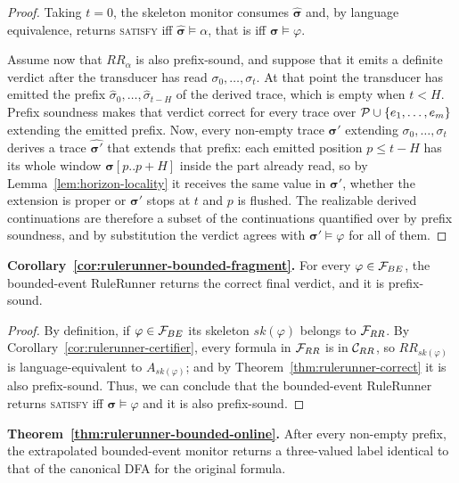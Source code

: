 \begin{proof}
\medskip
\noindent
Taking $t=0$, the skeleton monitor consumes $\widehat{\boldsymbol{\sigma}}$
and, by language equivalence, returns \textsc{satisfy} iff
$\widehat{\boldsymbol{\sigma}}\models\alpha$, that is iff
$\boldsymbol{\sigma}\models\varphi$.

Assume now that $RR_\alpha$ is also prefix-sound, and suppose that it emits a
definite verdict after the transducer has read $\sigma_0,\ldots,\sigma_t$. At
that point the transducer has emitted the prefix
$\hat{\sigma}_0,\ldots,\hat{\sigma}_{t-H}$ of the derived trace, which is empty
when $t<H$. Prefix soundness makes that verdict correct for every trace over
${\mathcal{P}}\cup\{e_1,\ldots,e_m\}$ extending the emitted prefix. Now, every
non-empty trace $\boldsymbol{\sigma}'$ extending $\sigma_0,\ldots,\sigma_t$
derives a trace $\widehat{\boldsymbol{\sigma}'}$ that extends that prefix: each
emitted position $p\leq t-H$ has its whole window $\boldsymbol{\sigma}[p..p+H]$
inside the part already read, so by Lemma~\ref{lem:horizon-locality} it
receives the same value in $\boldsymbol{\sigma}'$, whether the extension is
proper or $\boldsymbol{\sigma}'$ stops at $t$ and $p$ is flushed. The
realizable derived continuations are therefore a subset of the continuations
quantified over by prefix soundness, and by substitution the verdict agrees
with $\boldsymbol{\sigma}'\models\varphi$ for all of them.
\end{proof}

\noindent
\textbf{Corollary~\ref{cor:rulerunner-bounded-fragment}.}
For every $\varphi\in{\ensuremath{\mathcal{F}}}_{BE}$, the bounded-event RuleRunner returns the correct
final verdict, and it is prefix-sound.

\begin{proof}
By definition, if $\varphi\in{\ensuremath{\mathcal{F}}}_{BE}$ its skeleton $sk(\varphi)$ belongs to
${\mathcal{F}}_{RR}$. By Corollary~\ref{cor:rulerunner-certifier}, every formula in
${\mathcal{F}}_{RR}$ is in ${\mathcal{C}}_{RR}$, so $RR_{sk(\varphi)}$ is language-equivalent to
$A_{sk(\varphi)}$; and by Theorem~\ref{thm:rulerunner-correct} it is also
prefix-sound. Thus, we
can conclude that the bounded-event RuleRunner returns \textsc{satisfy} iff
$\boldsymbol{\sigma}\models\varphi$ and it is also prefix-sound.
\end{proof}


\noindent
\textbf{Theorem~\ref{thm:rulerunner-bounded-online}.}
After every non-empty prefix, the extrapolated bounded-event monitor returns a
three-valued label identical to that of the canonical DFA for the original
formula.

